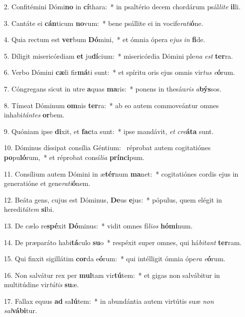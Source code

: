 2. Confitémini Dómi\textbf{no} in \textbf{cí}thara:~*  in psaltério decem chordárum psál\textit{li}\textit{te} \textbf{il}li.\

3. Cantáte ei \textbf{cán}ticum \textbf{no}vum:~*  bene psállite ei in vocife\textit{ra}\textit{ti}\textbf{ó}ne.\

4. Quia rectum est \textbf{ver}bum \textbf{Dó}mini,~*  et ómnia ópera e\textit{jus} \textit{in} \textbf{fi}de.\

5. Díligit misericórdiam \textbf{et} ju\textbf{dí}cium:~*  misericórdia Dómini ple\textit{na} \textit{est} \textbf{ter}ra.\

6. Verbo Dómini \textbf{cæ}li fir\textbf{má}ti sunt:~*  et spíritu oris ejus omnis vir\textit{tus} \textit{e}\textbf{ó}rum.\

7. Cóngregans sicut in utre \textbf{a}quas \textbf{ma}ris:~*  ponens in thesáu\textit{ris} \textit{a}\textbf{býs}sos.\

8. Tímeat Dóminum \textbf{om}nis \textbf{ter}ra:~*  ab eo autem commoveántur omnes inhabi\textit{tán}\textit{tes} \textbf{or}bem.\

9. Quóniam ipse \textbf{di}xit, et \textbf{fac}ta sunt:~*  ipse mandávit, \textit{et} \textit{cre}\textbf{á}\textbf{ta} sunt.\

10. Dóminus díssipat consília Géntium: \dag\  réprobat autem cogitatiónes \textbf{po}pu\textbf{ló}rum,~*  et réprobat consí\textit{li}\textit{a} \textbf{prín}\textbf{ci}pum.\

11. Consílium autem Dómini in æ\textbf{tér}num \textbf{ma}net:~*  cogitatiónes cordis ejus in generatióne et gene\textit{ra}\textit{ti}\textbf{ó}nem.\

12. Beáta gens, cujus est Dóminus, \textbf{De}us \textbf{e}jus:~*  pópulus, quem elégit in heredi\textit{tá}\textit{tem} \textbf{si}bi.\

13. De cælo re\textbf{spé}xit \textbf{Dó}minus:~*  vidit omnes fí\textit{li}\textit{os} \textbf{hó}\textbf{mi}num.\

14. De præparáto habi\textbf{tá}culo \textbf{su}o~*  respéxit super omnes, qui há\textit{bi}\textit{tant} \textbf{ter}ram.\

15. Qui finxit sigillátim \textbf{cor}da e\textbf{ó}rum:~*  qui intélligit ómnia ópe\textit{ra} \textit{e}\textbf{ó}rum.\

16. Non salvátur rex per \textbf{mul}tam vir\textbf{tú}tem:~*  et gigas non salvábitur in multitúdine vir\textit{tú}\textit{tis} \textbf{su}æ.\

17. Fallax equus \textbf{ad} sa\textbf{lú}tem:~*  in abundántia autem virtútis suæ \textit{non} \textit{sal}\textbf{vá}\textbf{bi}tur.\

